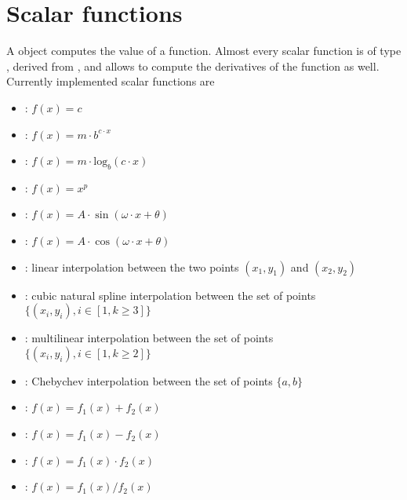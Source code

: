 %
%
%
%
%
%
%
%

\section{Scalar functions}\label{sec:ScalarFunction}
A  object computes the value of a function.
Almost every scalar function is of type ,
derived from , and allows to compute the derivatives of
the function as well. Currently implemented scalar functions are
\begin{itemize}
\item {}: $f(x)=c$
\item {}: $f(x)=m\cdot b^{c\cdot{x}}$
\item {}: $f(x)=m\cdot\textrm{log}_b(c\cdot{x})$
\item {}: $f(x)=x^p$
\item {}: $f(x)=A \cdot \sin(\omega \cdot x + \theta)$
\item {}: $f(x)=A \cdot \cos(\omega \cdot x + \theta)$
\item {}: linear interpolation between the two points $(x_1,y_1)$
and $(x_2,y_2)$
\item {}: cubic natural spline interpolation between the
set of points $\{(x_i,y_i), i\in[1,k\geq3]\}$
\item {}: multilinear interpolation between the
set of points $\{(x_i,y_i), i\in[1,k\geq2]\}$
\item {}: Chebychev interpolation between the
set of points $\{a,b\}$
\item {}: $f(x)=f_1(x) + f_2(x)$
\item {}: $f(x)=f_1(x) - f_2(x)$
\item {}: $f(x)=f_1(x) \cdot f_2(x)$
\item {}: $f(x)=f_1(x) / f_2(x)$
\end{itemize}

